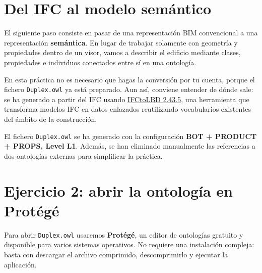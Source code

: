 \documentclass[
  spanish,
  11pt,
  a4paper,
  DIV=11,
  numbers=noendperiod]{scrartcl}
\begin{document}
\section{Del IFC al modelo
semántico}\label{del-ifc-al-modelo-semuxe1ntico}

El siguiente paso consiste en pasar de una representación BIM
convencional a una representación \textbf{semántica}. En lugar de
trabajar solamente con geometría y propiedades dentro de un visor, vamos
a describir el edificio mediante clases, propiedades e individuos
conectados entre sí en una ontología.

En esta práctica no es necesario que hagas la conversión por tu cuenta,
porque el fichero \texttt{Duplex.owl} ya está preparado. Aun así,
conviene entender de dónde sale: se ha generado a partir del IFC usando
\href{https://github.com/jyrkioraskari/IFCtoLBD/releases/tag/2.43.5}{IFCtoLBD
2.43.5}, una herramienta que transforma modelos IFC en datos enlazados
reutilizando vocabularios existentes del ámbito de la construcción.

\begin{tcolorbox}[enhanced jigsaw, leftrule=.75mm, breakable, colback=white, colbacktitle=quarto-callout-note-color!10!white, bottomrule=.15mm, left=2mm, bottomtitle=1mm, coltitle=black, toprule=.15mm, toptitle=1mm, rightrule=.15mm, opacityback=0, title=\textcolor{quarto-callout-note-color}{\faInfo}\hspace{0.5em}{Nota técnica}, arc=.35mm, titlerule=0mm, colframe=quarto-callout-note-color-frame, opacitybacktitle=0.6]

El fichero \texttt{Duplex.owl} se ha generado con la configuración
\textbf{BOT + PRODUCT + PROPS, Level L1}. Además, se han eliminado
manualmente las referencias a dos ontologías externas para simplificar
la práctica.

\end{tcolorbox}

\section{Ejercicio 2: abrir la ontología en
Protégé}\label{ejercicio-2-abrir-la-ontologuxeda-en-protuxe9guxe9}

Para abrir \texttt{Duplex.owl} usaremos \textbf{Protégé}, un editor de
ontologías gratuito y disponible para varios sistemas operativos. No
requiere una instalación compleja: basta con descargar el archivo
comprimido, descomprimirlo y ejecutar la aplicación.
\end{document}
